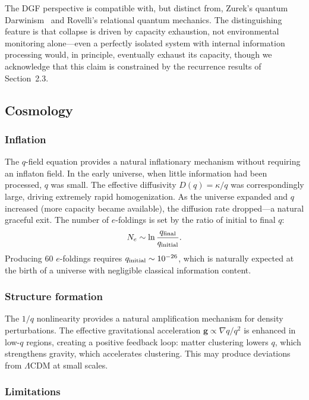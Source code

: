 \documentclass[12pt]{article}
\begin{document}
The DGF perspective is compatible with, but distinct from, Zurek's quantum Darwinism~\cite{Zurek2009} and Rovelli's relational quantum mechanics. The distinguishing feature is that collapse is driven by capacity exhaustion, not environmental monitoring alone---even a perfectly isolated system with internal information processing would, in principle, eventually exhaust its capacity, though we acknowledge that this claim is constrained by the recurrence results of Section~2.3.

\subsection{Cosmology}

\subsubsection{Inflation}

The $q$-field equation provides a natural inflationary mechanism without requiring an inflaton field. In the early universe, when little information had been processed, $q$ was small. The effective diffusivity $D(q)=\kappa/q$ was correspondingly large, driving extremely rapid homogenization. As the universe expanded and $q$ increased (more capacity became available), the diffusion rate dropped---a natural graceful exit. The number of $e$-foldings is set by the ratio of initial to final $q$:
\begin{equation}
N_e \sim \ln\frac{q_{\rm final}}{q_{\rm initial}}.
\end{equation}
Producing 60 $e$-foldings requires $q_{\rm initial}\sim 10^{-26}$, which is naturally expected at the birth of a universe with negligible classical information content.

\subsubsection{Structure formation}

The $1/q$ nonlinearity provides a natural amplification mechanism for density perturbations. The effective gravitational acceleration $\mathbf{g}\propto \nabla q/q^2$ is enhanced in low-$q$ regions, creating a positive feedback loop: matter clustering lowers $q$, which strengthens gravity, which accelerates clustering. This may produce deviations from $\Lambda$CDM at small scales.

\subsubsection{Limitations}
\end{document}
